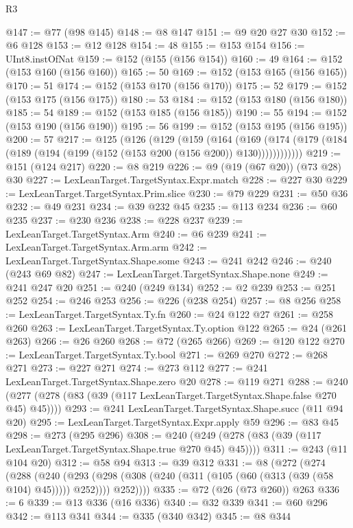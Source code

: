 \begin{lexlean}{R3}
\begin{coremodule}
@147 := @77 (@98 @145)
@148 := @8 @147
@151 := @9 @20 @27 @30
@152 := @6 @128
@153 := @12 @128
@154 := 48
@155 := @153 @154
@156 := UInt8.instOfNat
@159 := @152 (@155 (@156 @154))
@160 := 49
@164 := @152 (@153 @160 (@156 @160))
@165 := 50
@169 := @152 (@153 @165 (@156 @165))
@170 := 51
@174 := @152 (@153 @170 (@156 @170))
@175 := 52
@179 := @152 (@153 @175 (@156 @175))
@180 := 53
@184 := @152 (@153 @180 (@156 @180))
@185 := 54
@189 := @152 (@153 @185 (@156 @185))
@190 := 55
@194 := @152 (@153 @190 (@156 @190))
@195 := 56
@199 := @152 (@153 @195 (@156 @195))
@200 := 57
@217 := @125
    (@126
      (@129
        (@159
          (@164
            (@169 (@174 (@179 (@184 (@189 (@194 (@199 (@152 (@153 @200 (@156 @200)) @130))))))))))))
@219 := @151 (@124 @217)
@220 := @8 @219
@226 := @9 (@19 (@67 @20)) (@73 @28) @30
@227 := LexLeanTarget.TargetSyntax.Expr.match
@228 := @227 @30
@229 := LexLeanTarget.TargetSyntax.Prim.slice
@230 := @79 @229
@231 := @50 @36
@232 := @49 @231
@234 := @39 @232 @45
@235 := @113 @234
@236 := @60 @235
@237 := @230 @236
@238 := @228 @237
@239 := LexLeanTarget.TargetSyntax.Arm
@240 := @6 @239
@241 := LexLeanTarget.TargetSyntax.Arm.arm
@242 := LexLeanTarget.TargetSyntax.Shape.some
@243 := @241 @242
@246 := @240 (@243 @69 @82)
@247 := LexLeanTarget.TargetSyntax.Shape.none
@249 := @241 @247 @20
@251 := @240 (@249 @134)
@252 := @2 @239
@253 := @251 @252
@254 := @246 @253
@256 := @226 (@238 @254)
@257 := @8 @256
@258 := LexLeanTarget.TargetSyntax.Ty.fn
@260 := @24 @122 @27
@261 := @258 @260
@263 := LexLeanTarget.TargetSyntax.Ty.option @122
@265 := @24 (@261 @263)
@266 := @26 @260
@268 := @72 (@265 @266)
@269 := @120 @122
@270 := LexLeanTarget.TargetSyntax.Ty.bool
@271 := @269 @270
@272 := @268 @271
@273 := @227 @271
@274 := @273 @112
@277 := @241 LexLeanTarget.TargetSyntax.Shape.zero @20
@278 := @119 @271
@288 := @240 (@277 (@278 (@83 (@39 (@117 LexLeanTarget.TargetSyntax.Shape.false @270 @45) @45))))
@293 := @241 LexLeanTarget.TargetSyntax.Shape.succ (@11 @94 @20)
@295 := LexLeanTarget.TargetSyntax.Expr.apply @59
@296 := @83 @45
@298 := @273 (@295 @296)
@308 := @240 (@249 (@278 (@83 (@39 (@117 LexLeanTarget.TargetSyntax.Shape.true @270 @45) @45))))
@311 := @243 (@11 @104 @20)
@312 := @58 @94
@313 := @39 @312
@331 := @8
    (@272
      (@274
        (@288
          (@240
            (@293 (@298 (@308 (@240 (@311 (@105 (@60 (@313 (@39 (@58 @104) @45))))) @252))))
            @252))))
@335 := @72 (@26 (@73 @260)) @263
@336 := 6
@339 := @13 @336 (@16 @336)
@340 := @32 @339
@341 := @60 @296
@342 := @113 @341
@344 := @335 (@340 @342)
@345 := @8 @344

\end{coremodule}
\end{lexlean}
